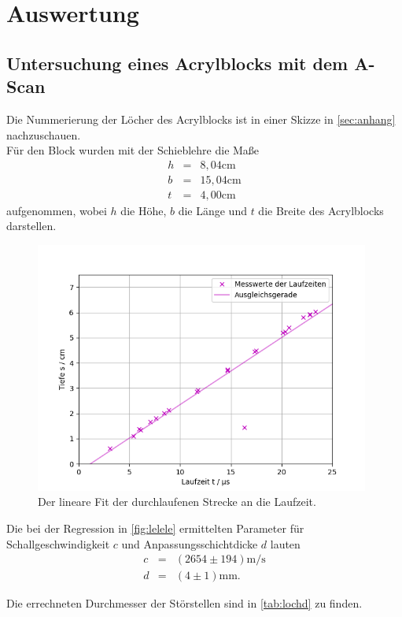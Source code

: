 \section{Auswertung}
\label{sec:Auswertung}

\subsection{Untersuchung eines Acrylblocks mit dem A-Scan}
Die Nummerierung der Löcher des Acrylblocks ist in einer Skizze in \autoref{sec:anhang} nachzuschauen.\\
Für den Block wurden mit der Schieblehre die Maße
\begin{eqnarray}
    h &=& 8,04 \mathrm{cm} \nonumber \\
    b &=& 15,04 \mathrm{cm} \nonumber \\
    t &=& 4,00 \mathrm{cm} \nonumber 
\end{eqnarray}
aufgenommen, wobei $h$ die Höhe, $b$ die Länge und $t$ die Breite des Acrylblocks darstellen. 
\begin{figure}[H]
  \centering
  \includegraphics[width = 11cm]{content/korrektur_fit.png}
  \caption{Der lineare Fit der durchlaufenen Strecke an die Laufzeit.}
  \label{fig:lelele}
\end{figure}
Die bei der Regression in \autoref{fig:lelele} ermittelten Parameter für Schallgeschwindigkeit $c$ und Anpassungsschichtdicke $d$ lauten
\begin{eqnarray}
    c &=& (2654 \pm 194) \mathrm{m/s} \nonumber \\
    d &=& (4 \pm 1 )\mathrm{mm.} \nonumber 
\end{eqnarray}

Die errechneten Durchmesser der Störstellen sind in \autoref{tab:lochd} zu finden.\\


